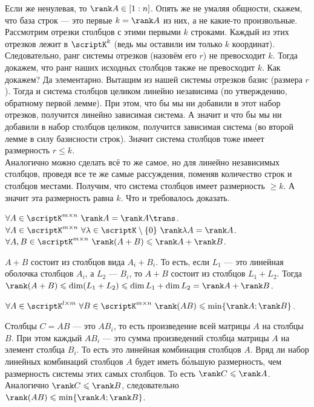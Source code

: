 \documentclass{article}
\begin{document}
\begin{itemize}
\begin{Proof}
            Если же ненулевая, то $\rank A\in[1:n]$. Опять же не умаляя общности, скажем, что база строк --- это первые $k=\rank A$ из них, а не какие-то произвольные. Рассмотрим отрезки столбцов с этими первыми $k$ строками. Каждый из этих отрезков лежит в $\scriptK^k$ (ведь мы оставили им только $k$ координат). Следовательно, ранг системы отрезков (назовём его $r$) не превосходит $k$. Тогда докажем, что ранг наших исходных столбцов также не превосходит $k$. Как докажем? Да элементарно. Вытащим из нашей системы отрезков базис (размера $r$). Тогда и система столбцов целиком линейно независима (по утверждению, обратному первой лемме). При этом, что бы мы ни добавили в этот набор отрезков, получится линейно зависимая система. А значит и что бы мы ни добавили в набор столбцов целиком, получится зависимая система (во второй лемме в силу базисности строк). Значит система столбцов тоже имеет размерность $r\leqslant k$.\\
            Аналогично можно сделать всё то же самое, но для линейно независимых столбцов, проведя все те же самые рассуждения, поменяв количество строк и столбцов местами. Получим, что система столбцов имеет размерность $\geqslant k$. А значит эта размерность равна $k$. Что и требовалось доказать.
        \end{Proof}
        \thm $\forall A\in\scriptK^{m\times n}~\rank A=\rank A\trans$.
        \thm $\forall A\in\scriptK^{m\times n}~\forall\lambda\in\scriptK\setminus\{0\}~\rank\lambda A=\rank A$.
        \thm $\forall A,B\in\scriptK^{m\times n}~\rank(A+B)\leqslant\rank A+\rank B$.
        \begin{Proof}
            $A+B$ состоит из столбцов вида $A_i+B_i$. То есть, если $L_1$ --- это линейная оболочка столбцов $A_i$, а $L_2$ --- $B_i$, то $A+B$ состоит из столбцов $L_1+L_2$. Тогда $\rank(A+B)\leqslant\dim(L_1+L_2)\leqslant\dim L_1+\dim L_2=\rank A+\rank B$.
        \end{Proof}
        \thm $\forall A\in\scriptK^{l\times m}~\forall B\in\scriptK^{m\times n}~\rank(AB)\leqslant\min\{\rank A;\rank B\}$.
        \begin{Proof}
            Столбцы $C=AB$ --- это $AB_i$, то есть произведение всей матрицы $A$ на столбцы $B$. При этом каждый $AB_i$ --- это сумма произведений столбца матрицы $A$ на элемент столбца $B_i$. То есть это линейная комбинация столбцов $A$. Вряд ли набор линейных комбинаций столбцов $A$ будет иметь б\'{о}льшую размерность, чем размерность системы этих самых столбцов. То есть $\rank C\leqslant\rank A$. Аналогично $\rank C\leqslant\rank B$, следовательно $\rank(AB)\leqslant\min\{\rank A;\rank B\}$.

\end{Proof}
\end{itemize}
\end{document}
